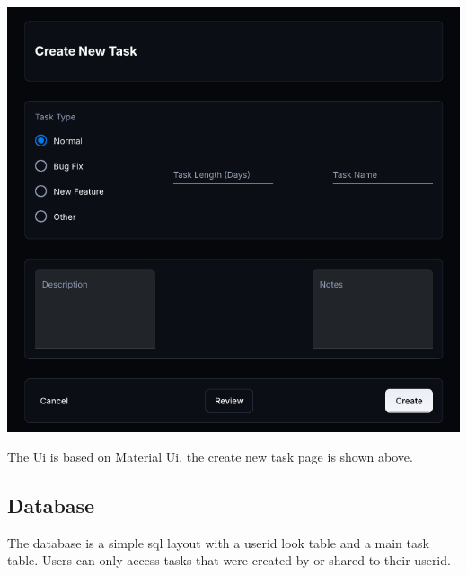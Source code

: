 \documentclass{article}
\begin{document}
\includegraphics[width=0.9\linewidth]{./logo/mockup.png} 

The Ui is based on Material Ui\cite{mui}, the create new task page is shown above.

\subsection{Database}
The database is a simple \Gls{sql} layout with a userid look table and a main task table. Users can only access tasks that were created by or shared to their userid.


\pagebreak
\printglossaries

\printbibliography
\end{document}

